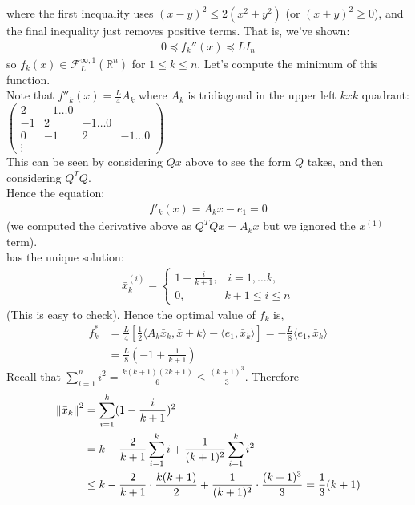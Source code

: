 \documentclass[12pt,a4paper]{article}
\begin{document}
	where the first inequality uses $(x - y)^2 \leq 2(x^2 + y^2)$ (or $(x + y)^2 \geq 0$), and the final inequality just removes positive terms. That is, we've shown:
	\begin{align*}
		0 \preceq f_k''(x) \preceq L I_n
	\end{align*}
	so $f_k(x) \in \mathcal{F}_L^{\infty, 1}(\mathbb{R}^n)$ for $1 \leq k \leq n$. Let's compute the minimum of this function. \\
	Note that $f''_k(x) = \frac{L}{4}A_k$ where $A_k$ is tridiagonal in the upper left $kxk$ quadrant:\\
	$
	\begin{pmatrix}
	2 & -1  \ldots 0 \\
	-1 & 2 & -1  \ldots 0 \\
	0 & -1 & 2 & -1  \ldots 0 \\
	\vdots 
	\end{pmatrix}
	$\\
	This can be seen by considering $Qx$ above to see the form $Q$ takes, and then considering $Q^TQ$.\\
	Hence the equation:
	\begin{align*}
		f'_k(x) = A_kx - e_1 = 0
	\end{align*}
	(we computed the derivative above as $Q^TQx = A_kx$ but we ignored the $x^{(1)}$ term).\\
	has the unique solution:
	\begin{align*}
		\bar{x}_k^{(i)} = 
		\begin{cases}
			1 - \frac{i}{k+1}, \hspace{10pt} i = 1, \ldots k, \\
			0, \hspace{42pt} k+1 \leq i \leq n 
		\end{cases}
	\end{align*} 
	(This is easy to check). Hence the optimal value of $f_k$ is,
	\begin{align*}
		f_k^* &= \frac{L}{4}[\frac{1}{2}\langle A_k\bar{x}_k, \bar{x}+k \rangle - \langle e_1, \bar{x}_k \rangle] = -\frac{L}{8} \langle e_1, \bar{x}_k \rangle \\
		&=\frac{L}{8}(-1 + \frac{1}{k+1})
	\end{align*}
	Recall that $\sum_{i=1}^{n}i^2 = \frac{k(k+1)(2k+1)}{6} \leq \frac{(k+1)^3}{3}$. Therefore
	\begin{align*}
		\norm{\bar{x}_k}^2 &= \sum_{i=1}^{k}(1 - \frac{i}{k+1})^2 \\
		&= k - \frac{2}{k+1}\sum_{i=1}^{k}i + \frac{1}{(k+1)^2}\sum_{i=1}^{k}i^2 \\
		&\leq k - \frac{2}{k+1}\cdot \frac{k(k+1)}{2} + \frac{1}{(k+1)^2} \cdot \frac{(k+1)^3}{3} = \frac{1}{3}(k+1)
	\end{align*}
\end{document}
